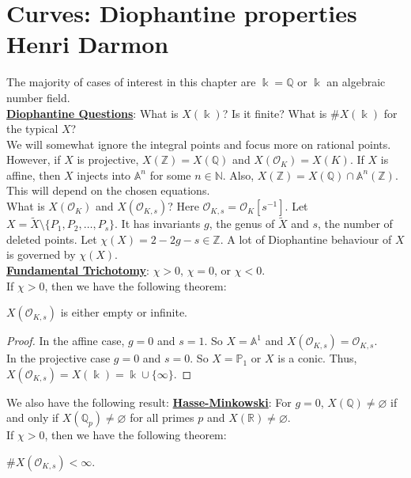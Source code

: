 \chapter{Curves:  Diophantine properties \\ Henri Darmon}\label{ch:7}

The majority of cases of interest in this chapter are $\Bbbk=\mathbb{Q}$ or $\Bbbk$ an algebraic number field.\\
\indent \underline{\textbf{Diophantine Questions}}:  What is $X(\Bbbk)$?  Is it finite?  What is $\#X(\Bbbk)$ for the typical $X$?\\
\indent We will somewhat ignore the integral points and focus more on rational points.  However, if $X$ is projective, $X(\mathbb{Z})=X(\mathbb{Q})$ and $X(\mathscr{O}_{K})=X(K)$.  If $X$ is affine, then $X$ injects into $\mathbb{A}^{n}$ for some $n \in \mathbb{N}$.  Also, $X(\mathbb{Z})=X(\mathbb{Q}) \cap \mathbb{A}^{n}(\mathbb{Z})$.  This will depend on the chosen equations.\\
\indent What is $X(\mathscr{O}_{K})$ and $X(\mathscr{O}_{K,s})$?  Here $\mathscr{O}_{K,s}=\mathscr{O}_{K}[s^{-1}]$.  Let $X=\tilde{X}\setminus\{P_{1},P_{2},\dotsc,P_{s}\}$.  It has invariants $g$, the genus of $\tilde{X}$ and $s$, the number of deleted points.  Let $\chi(X)=2-2g-s \in \mathbb{Z}$.  A lot of Diophantine behaviour of $X$ is governed by $\chi(X)$.\\
\indent \underline{\textbf{Fundamental Trichotomy}}:  $\chi > 0$, $\chi=0$, or $\chi < 0$.\\
\indent If $\chi > 0$, then we have the following theorem:
\begin{theorem}
$X(\mathscr{O}_{K,s})$ is either empty or infinite.
\end{theorem}
\begin{proof}
In the affine case, $g=0$ and $s=1$.  So $X=\mathbb{A}^{1}$ and $X(\mathscr{O}_{K,s})=\mathscr{O}_{K,s}$.\\
\indent In the projective case $g=0$ and $s=0$.  So $X=\mathbb{P}_{1}$ or $X$ is a conic.  Thus, $X(\mathscr{O}_{K,s})=X(\Bbbk)=\Bbbk \cup \{\infty\}$.
\end{proof}
\indent We also have the following result:  \underline{\textbf{Hasse-Minkowski}}:  For $g=0$, $X(\mathbb{Q}) \ne \varnothing$ if and only if $X(\mathbb{Q}_{p}) \ne \varnothing$ for all primes $p$ and $X(\mathbb{R}) \ne \varnothing$.\\
\indent If $\chi > 0$, then we have the following theorem:
\begin{theorem}
$\#X(\mathscr{O}_{K,s}) < \infty$.
\end{theorem}
